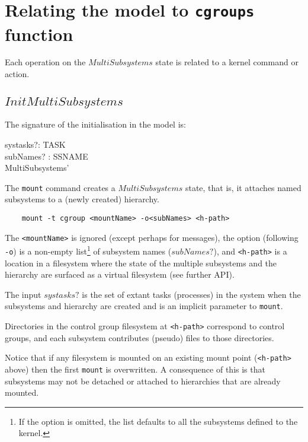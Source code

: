 \documentclass[a4paper,twoside,12pt]{article}
\begin{document}
\section{Relating the model to \texttt{cgroups} function}
\label{sec:kernel}

Each operation on the $MultiSubsystems$ state is related to a kernel command or action. 

\subsection{$InitMultiSubsystems$}

The signature of the initialisation in the model is:

\begin{schema*}
    systasks?: \finset TASK \\
    subNames? : \finset SSNAME \\
\also
  MultiSubsystems'
\end{schema*}
The \texttt{mount} command creates a $MultiSubsystems$ state, that is, it attaches named subsystems to a 
(newly created) hierarchy.

\begin{verbatim}
    mount -t cgroup <mountName> -o<subNames> <h-path>
\end{verbatim}
The \texttt{<mountName>} is ignored (except perhaps for messages), 
the option (following \texttt{-o}) is a non-empty list\footnote{If the option is omitted, the list defaults to all the subsystems defined to the kernel.} of subsystem names
($subNames?$), and \texttt{<h-path>} is a location in a filesystem
where the state of the multiple subsystems and the hierarchy are surfaced as a virtual filesystem (see further API).

The input $systasks?$ is the set of extant tasks (processes) in the system when the subsystems and hierarchy
are created and is an implicit parameter to \texttt{mount}.

Directories in the control group filesystem at \texttt{<h-path>} correspond to control groups, 
and each subsystem contributes
(pseudo) files to those directories.

Notice that if any filesystem is mounted on an existing mount point (\texttt{<h-path>} above) then the first 
\texttt{mount} is overwritten.
A consequence of this is that subsystems may not be detached or attached to hierarchies that are already mounted.
\end{document}
